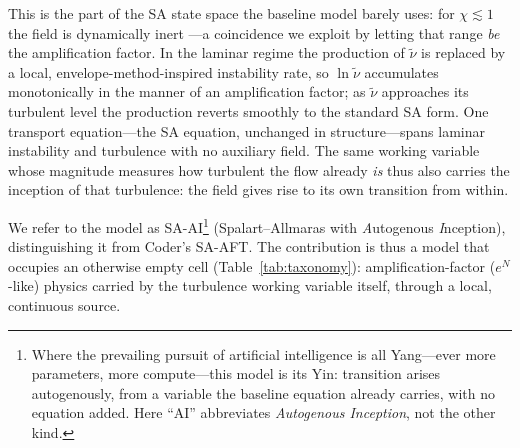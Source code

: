 \documentclass[journal]{new-aiaa}
\begin{document}
This is the part of the SA state space the baseline model barely uses:
for $\chi\!\lesssim\!1$ the field is dynamically
inert \cite{spalart_allmaras_1994}---a coincidence we exploit by
letting that range \emph{be} the
amplification factor. In the laminar regime the production of $\tilde\nu$ is replaced by a local,
envelope-method-inspired instability rate, so $\ln\tilde\nu$ accumulates
monotonically in the manner of an amplification factor; as $\tilde\nu$ approaches its
turbulent level the production reverts smoothly to the standard SA form. One
transport equation---the SA equation, unchanged in structure---spans laminar
instability and turbulence with no auxiliary field. The same working variable
whose magnitude measures how turbulent the flow already \emph{is} thus also
carries the inception of that turbulence: the field gives rise to its own
transition from within.

We refer to the model as SA-AI\footnote{Where the prevailing pursuit of
artificial intelligence is all Yang---ever more parameters, more compute---this
model is its Yin: transition arises autogenously, from a variable the baseline
equation already carries, with no equation added. Here ``AI'' abbreviates
\emph{Autogenous Inception}, not the other kind.} (Spalart--Allmaras with
\emph{A}utogenous \emph{I}nception), distinguishing it from Coder's
SA-AFT. The contribution is thus a
model that occupies an otherwise empty cell
(Table~\ref{tab:taxonomy}): amplification-factor ($e^N$-like) physics carried by the
turbulence working variable itself, through a local, continuous source.
\end{document}
